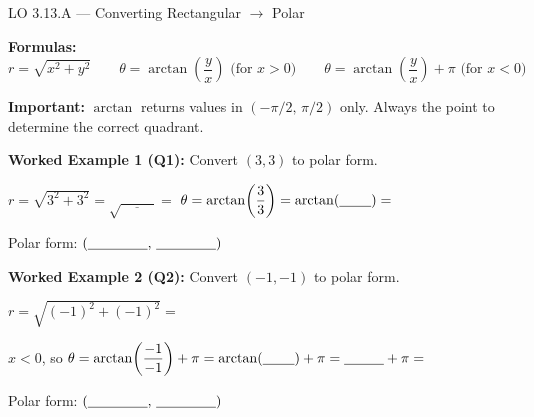\documentclass[10pt]{article}
\begin{document}
\vspace{0.08in}

\begin{notesbox}{LO 3.13.A --- Converting Rectangular $\to$ Polar}

\textbf{Formulas:}
$$r = \sqrt{x^2 + y^2} \qquad \theta = \arctan\!\left(\frac{y}{x}\right) \text{ (for } x > 0\text{)}
\qquad \theta = \arctan\!\left(\frac{y}{x}\right) + \pi \text{ (for } x < 0\text{)}$$

\textbf{Important:} $\arctan$ returns values in $(-\pi/2,\, \pi/2)$ only.
Always \underline{\hspace{2cm}} the point to determine the correct quadrant.

\vspace{8pt}
\textbf{Worked Example 1 (Q1):} Convert $(3,3)$ to polar form.

\vspace{4pt}
$r = \sqrt{3^2 + 3^2} = \sqrt{\underline{\hspace{1cm}}} = $ \underline{\hspace{2cm}}
\qquad $\theta = \arctan\!\left(\dfrac{3}{3}\right) = \arctan(\underline{\hspace{0.8cm}}) = $ \underline{\hspace{1.5cm}}

\vspace{4pt}
Polar form: $(\underline{\hspace{1.5cm}},\, \underline{\hspace{1.5cm}})$

\vspace{8pt}
\textbf{Worked Example 2 (Q2):} Convert $(-1, -1)$ to polar form.

\vspace{4pt}
$r = \sqrt{(-1)^2+(-1)^2} = $ \underline{\hspace{2cm}}

\vspace{4pt}
$x < 0$, so $\theta = \arctan\!\left(\dfrac{-1}{-1}\right) + \pi
= \arctan(\underline{\hspace{0.8cm}}) + \pi
= \underline{\hspace{1cm}} + \pi = $ \underline{\hspace{2cm}}

\vspace{4pt}
Polar form: $(\underline{\hspace{1.5cm}},\, \underline{\hspace{1.5cm}})$

\end{notesbox}
\end{document}

